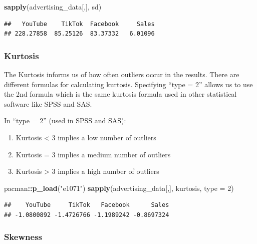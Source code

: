 \documentclass[
]{article}
\newenvironment{Shaded}{\begin{snugshade}}{\end{snugshade}}
\newcommand{\AttributeTok}[1]{\textcolor[rgb]{0.13,0.29,0.53}{#1}}
\newcommand{\DecValTok}[1]{\textcolor[rgb]{0.00,0.00,0.81}{#1}}
\newcommand{\FunctionTok}[1]{\textcolor[rgb]{0.13,0.29,0.53}{\textbf{#1}}}
\newcommand{\NormalTok}[1]{#1}
\newcommand{\SpecialCharTok}[1]{\textcolor[rgb]{0.81,0.36,0.00}{\textbf{#1}}}
\newcommand{\StringTok}[1]{\textcolor[rgb]{0.31,0.60,0.02}{#1}}
\begin{document}
\begin{Shaded}
\begin{Highlighting}[]
\FunctionTok{sapply}\NormalTok{(advertising\_data[,], sd)}
\end{Highlighting}
\end{Shaded}

\begin{verbatim}
##   YouTube    TikTok  Facebook     Sales 
## 228.27858  85.25126  83.37332   6.01096
\end{verbatim}

\subsubsection{\texorpdfstring{\textbf{Kurtosis}}{Kurtosis}}\label{kurtosis}

The Kurtosis informs us of how often outliers occur in the results.
There are different formulas for calculating kurtosis. Specifying ``type
= 2'' allows us to use the 2nd formula which is the same kurtosis
formula used in other statistical software like SPSS and SAS.

In ``type = 2'' (used in SPSS and SAS):

\begin{enumerate}
\def\labelenumi{\arabic{enumi}.}
\item
  Kurtosis \textless{} 3 implies a low number of outliers
\item
  Kurtosis = 3 implies a medium number of outliers
\item
  Kurtosis \textgreater{} 3 implies a high number of outliers
\end{enumerate}

\begin{Shaded}
\begin{Highlighting}[]
\NormalTok{pacman}\SpecialCharTok{::}\FunctionTok{p\_load}\NormalTok{(}\StringTok{"e1071"}\NormalTok{)}
\FunctionTok{sapply}\NormalTok{(advertising\_data[,],  kurtosis, }\AttributeTok{type =} \DecValTok{2}\NormalTok{)}
\end{Highlighting}
\end{Shaded}

\begin{verbatim}
##    YouTube     TikTok   Facebook      Sales 
## -1.0800892 -1.4726766 -1.1989242 -0.8697324
\end{verbatim}

\subsubsection{\texorpdfstring{\textbf{Skewness}}{Skewness}}\label{skewness}
\end{document}
